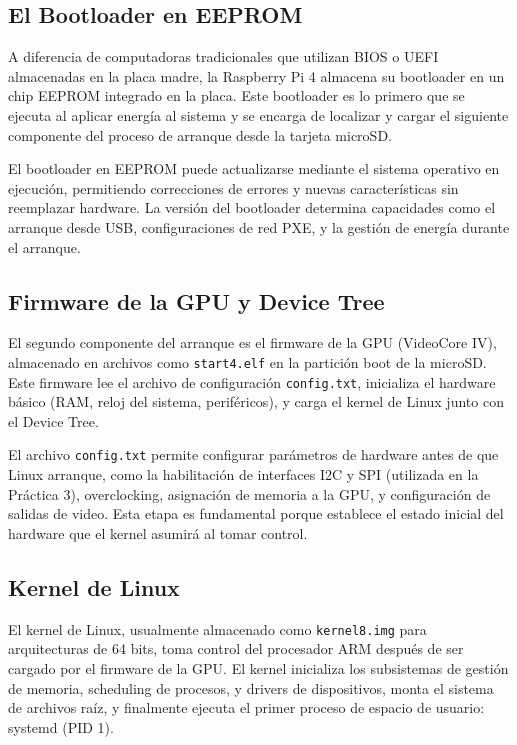 \documentclass[conference]{IEEEtran}
\begin{document}
\subsection{El Bootloader en EEPROM}

A diferencia de computadoras tradicionales que utilizan BIOS o UEFI almacenadas en la placa madre, la Raspberry Pi 4 almacena su bootloader en un chip EEPROM integrado en la placa. Este bootloader es lo primero que se ejecuta al aplicar energía al sistema y se encarga de localizar y cargar el siguiente componente del proceso de arranque desde la tarjeta microSD.

El bootloader en EEPROM puede actualizarse mediante el sistema operativo en ejecución, permitiendo correcciones de errores y nuevas características sin reemplazar hardware. La versión del bootloader determina capacidades como el arranque desde USB, configuraciones de red PXE, y la gestión de energía durante el arranque.

\subsection{Firmware de la GPU y Device Tree}

El segundo componente del arranque es el firmware de la GPU (VideoCore IV), almacenado en archivos como \texttt{start4.elf} en la partición boot de la microSD. Este firmware lee el archivo de configuración \texttt{config.txt}, inicializa el hardware básico (RAM, reloj del sistema, periféricos), y carga el kernel de Linux junto con el Device Tree.

El archivo \texttt{config.txt} permite configurar parámetros de hardware antes de que Linux arranque, como la habilitación de interfaces I2C y SPI (utilizada en la Práctica 3), overclocking, asignación de memoria a la GPU, y configuración de salidas de video. Esta etapa es fundamental porque establece el estado inicial del hardware que el kernel asumirá al tomar control.

\subsection{Kernel de Linux}

El kernel de Linux, usualmente almacenado como \texttt{kernel8.img} para arquitecturas de 64 bits, toma control del procesador ARM después de ser cargado por el firmware de la GPU. El kernel inicializa los subsistemas de gestión de memoria, scheduling de procesos, y drivers de dispositivos, monta el sistema de archivos raíz, y finalmente ejecuta el primer proceso de espacio de usuario: systemd (PID 1).
\end{document}

